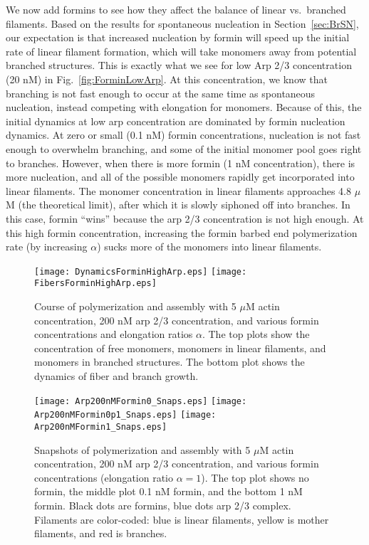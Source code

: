 \documentclass[11pt]{article}
\begin{document}
We now add formins to see how they affect the balance of linear vs.\ branched filaments. Based on the results for spontaneous nucleation in Section\ \ref{sec:BrSN}, our expectation is that increased nucleation by formin will speed up the initial rate of linear filament formation, which will take monomers away from potential branched structures. This is exactly what we see for low Arp 2/3 concentration (20 nM) in Fig.\ \ref{fig:ForminLowArp}. At this concentration, we know that branching is not fast enough to occur at the same time as spontaneous nucleation, instead competing with elongation for monomers. Because of this, the initial dynamics at low arp concentration are dominated by formin nucleation dynamics. At zero or small (0.1 nM) formin concentrations, nucleation is not fast enough to overwhelm branching, and some of the initial monomer pool goes right to branches. However, when there is more formin (1 nM concentration), there is more nucleation, and all of the possible monomers rapidly get incorporated into linear filaments. The monomer concentration in linear filaments approaches 4.8 $\mu$M (the theoretical limit), after which it is slowly siphoned off into branches. In this case, formin ``wins'' because the arp 2/3 concentration is not high enough. At this high formin concentration, increasing the formin barbed end polymerization rate (by increasing $\alpha$) sucks more of the monomers into linear filaments. 

\begin{figure}
\centering
\texttt{[image: DynamicsForminHighArp.eps]}
\texttt{[image: FibersForminHighArp.eps]}
\caption{\label{fig:ForminHighArp}Course of polymerization and assembly with 5 $\mu$M actin concentration, 200 nM arp 2/3 concentration, and various formin concentrations and elongation ratios $\alpha$. The top plots show the concentration of free monomers, monomers in linear filaments, and monomers in branched structures. The bottom plot shows the dynamics of fiber and branch growth. }
\end{figure}

\begin{figure}
\centering
\texttt{[image: Arp200nMFormin0\_Snaps.eps]}
\texttt{[image: Arp200nMFormin0p1\_Snaps.eps]}
\texttt{[image: Arp200nMFormin1\_Snaps.eps]}
\caption{\label{fig:ForminArpsSnaps}Snapshots of polymerization and assembly with 5 $\mu$M actin concentration, 200 nM arp 2/3 concentration, and various formin concentrations (elongation ratio $\alpha=1$). The top plot shows no formin, the middle plot 0.1 nM formin, and the bottom 1 nM formin. Black dots are formins, blue dots arp 2/3 complex. Filaments are color-coded: blue is linear filaments, yellow is mother filaments, and red is branches.}
\end{figure}
\end{document}
